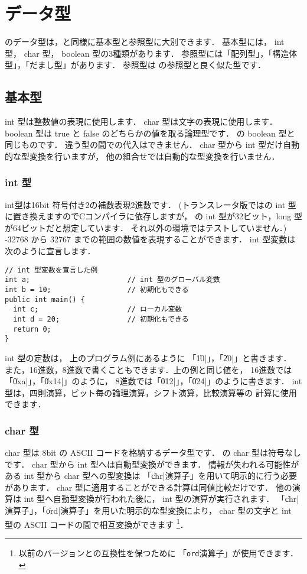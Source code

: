 \section{データ型}

\cmml のデータ型は，\javal と同様に基本型と参照型に大別できます．
基本型には， int 型， char 型， boolean 型の3種類があります．
参照型には「配列型」，「構造体型」，「だまし型」があります．
参照型は \javal の参照型と良く似た型です．

\subsection{基本型}

int 型は整数値の表現に使用します．
char 型は文字の表現に使用します．
boolean 型は true と false のどちらかの値を取る論理型です．
\javal の boolean 型と同じものです．
違う型の間での代入はできません．
char 型から int 型だけ自動的な型変換を行いますが，
他の組合せでは自動的な型変換を行いません．

\subsubsection{int 型}
int型は16bit 符号付き2の補数表現2進数です．
(トランスレータ版では\cl の int 型に置き換えますのでCコンパイラに依存しますが，
{\cl}の int 型が32ビット，long 型が64ビットだと想定しています．
それ以外の環境ではテストしていません．)
-32768 から 32767 までの範囲の数値を表現することができます．
int 型変数は次のように宣言します．

\begin{mylist}
\begin{verbatim}
// int 型変数を宣言した例
int a;                       // int 型のグローバル変数
int b = 10;                  // 初期化もできる
public int main() {
  int c;                     // ローカル変数
  int d = 20;                // 初期化もできる
  return 0;
}
\end{verbatim}
\end{mylist}

int 型の定数は，
上のプログラム例にあるように 「\|10|」，「\|20|」と書きます．
また，16進数，8進数で書くこともできます．上の例と同じ値を，
16進数では「\|0xa|」，「\|0x14|」のように，
8進数では「\|012|」，「\|024|」のように書きます．
int 型は，四則演算，ビット毎の論理演算，シフト演算，比較演算等の
計算に使用できます．

\subsubsection{char 型}
char 型は 8bit の ASCII コードを格納するデータ型です．
\cmm の char 型は符号なしです．
char 型から int 型へは自動型変換ができます．
情報が失われる可能性がある int 型から char 型への型変換は
「\|chr|演算子」を用いて明示的に行う必要があります．
char 型に適用することができる計算は同値比較だけです．
他の演算は int 型へ自動型変換が行われた後に，
int 型の演算が実行されます．
「\|chr|演算子」，「\|ord|演算子」を用いた明示的な型変換により，
char 型の文字と int 型の ASCII コードの間で相互変換ができます
\footnote{以前のバージョンとの互換性を保つために
「\texttt{ord}演算子」が使用できます．}．

